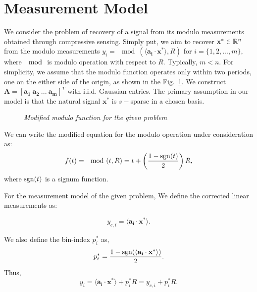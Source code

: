 \section{Measurement Model}
We consider the problem of recovery of a signal from its modulo measurements obtained through compressive sensing. Simply put, we aim to recover $\mathbf{x^*}\in {\mathbb{R}}^n$ from the modulo measurements $y_i=\mod(\langle \mathbf{a_i} \cdot \mathbf{x^*} \rangle,R)$ for $i = \{1,2,...,m\}$, where $\mod$ is modulo operation with respect to $R$. Typically, $m<n$. For simplicity, we assume that the modulo function operates only within two periods, one on the either side of the origin, as shown in the Fig.~\ref{fig:graph}. We construct $\mathbf{A} = \left[\mathbf{a_1~a_2~...~a_m}\right]^T$ with i.i.d. Gaussian entries. The primary assumption in our model is that the natural signal $\mathbf{x^*}$ is $s-$sparse in a chosen basis. 

\begin{figure}[h]
	\begin{center}
\end{center}
\caption{\emph{Modified modulo function for the given problem}}
\label{fig:graph}
\end{figure}

We can write the modified equation for the modulo operation under consideration as:
$$
f(t) = \mod(t,R) = t+\left( \frac{1-\mathrm{sgn}(t)}{2}\right)R,
$$
where $\mathrm{sgn}(t)$ is a signum function.

For the measurement model of the given problem, 
We define the corrected linear measurements as: 

$$
y_{c,i} =\langle \mathbf{a_i} \cdot \mathbf{x^*} \rangle.
$$

We also define the bin-index $p^*_i$ as,
$$
p^*_i = \frac{1-\mathrm{sgn}(\langle \mathbf{a_i} \cdot \mathbf{x^*} \rangle)}{2}.
$$
Thus,
$$
y_i = \langle \mathbf{a_i} \cdot \mathbf{x^*} \rangle + p^*_iR = y_{c,i}+p^*_iR.
$$


